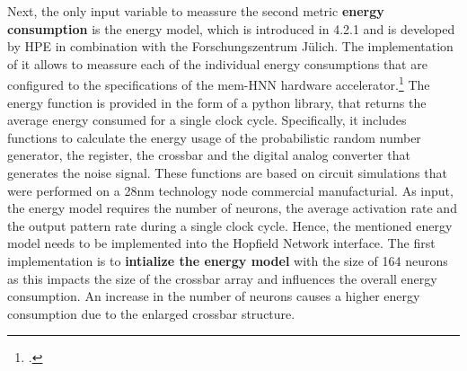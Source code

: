 Next, the only input variable to meassure the second metric \textbf{energy consumption} is the energy model, which is introduced in 4.2.1 and is developed by HPE in combination with the Forschungszentrum Jülich.
The implementation of it allows to meassure each of the individual energy consumptions that are configured to the specifications of the \ac{mem-HNN} hardware accelerator.\footcite[cf.][1-5]{hizzaniMemristorbasedHardwareAlgorithms2023}
The energy function is provided in the form of a python library, that returns the average energy consumed for a single clock cycle.
Specifically, it includes functions to calculate the energy usage of the probabilistic random number generator, the register, the crossbar and the digital analog converter that generates the noise signal.
These functions are based on circuit simulations that were performed on a 28nm technology node commercial manufacturial.
As input, the energy model requires the number of neurons, the average activation rate and the output pattern rate during a single clock cycle.
Hence, the mentioned energy model needs to be implemented into the Hopfield Network interface.
The first implementation is to \textbf{intialize the energy model} with the size of 164 neurons as this impacts the size of the crossbar array and influences the overall energy consumption.
An increase in the number of neurons causes a higher energy consumption due to the enlarged crossbar structure.

